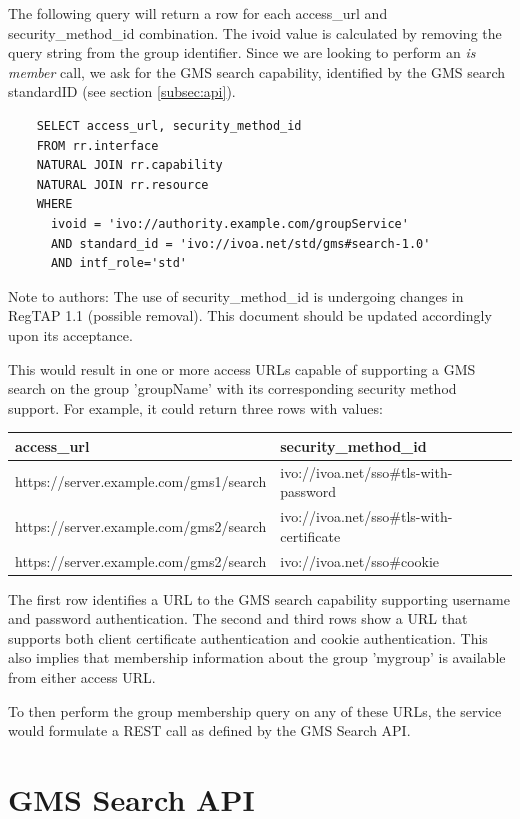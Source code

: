 \documentclass[11pt,a4paper]{ivoa}
\begin{document}
The following query will return a row for each access\_url and security\_method\_id combination.  The ivoid value is calculated by removing the query string from the group identifier.  Since we are looking to perform an \emph{is member} call, we ask for the GMS search capability, identified by the GMS search standardID (see section \ref{subsec:api}).

\begin{verbatim}
    SELECT access_url, security_method_id
    FROM rr.interface
    NATURAL JOIN rr.capability
    NATURAL JOIN rr.resource
    WHERE
      ivoid = 'ivo://authority.example.com/groupService'
      AND standard_id = 'ivo://ivoa.net/std/gms#search-1.0'
      AND intf_role='std'
\end{verbatim}

Note to authors:  The use of security\_method\_id is undergoing changes in RegTAP 1.1 (possible removal).  This document should be updated accordingly upon its acceptance.

This would result in one or more access URLs capable of supporting a GMS search on the group 'groupName' with its corresponding security method support.  For example, it could return three rows with values:

\vspace{3mm}
\hskip-1.0cm
\begin{tabular}{l l}
\textbf{access\_url} & \textbf{security\_method\_id} \\
\hline
https://server.example.com/gms1/search & ivo://ivoa.net/sso\#tls-with-password \\
https://server.example.com/gms2/search & ivo://ivoa.net/sso\#tls-with-certificate \\
https://server.example.com/gms2/search & ivo://ivoa.net/sso\#cookie \\
\hline
\end{tabular}
\vspace{3mm}

The first row identifies a URL to the GMS search capability supporting username and password authentication.  The second and third rows show a URL that supports both client certificate authentication and cookie authentication.  This also implies that membership information about the group 'mygroup' is available from either access URL.

To then perform the group membership query on any of these URLs, the service would formulate a REST call as defined by the GMS Search API.

\section{GMS Search API}
\end{document}
